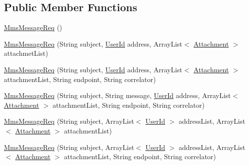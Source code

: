 \subsection*{Public Member Functions}
\begin{DoxyCompactItemize}
\item 
\hyperlink{classcom_1_1bluevia_1_1messagery_1_1mt_1_1mms_1_1data_1_1MmsMessageReq_a1d501dc4bd77173c12d12d321304e68e}{MmsMessageReq} ()
\item 
\hyperlink{classcom_1_1bluevia_1_1messagery_1_1mt_1_1mms_1_1data_1_1MmsMessageReq_a3ba28af29d71ecde161c1fda1d6c6350}{MmsMessageReq} (String subject, \hyperlink{classcom_1_1bluevia_1_1commons_1_1data_1_1UserId}{UserId} address, ArrayList$<$ \hyperlink{classcom_1_1bluevia_1_1messagery_1_1mt_1_1mms_1_1data_1_1Attachment}{Attachment} $>$ attachmetList)
\item 
\hyperlink{classcom_1_1bluevia_1_1messagery_1_1mt_1_1mms_1_1data_1_1MmsMessageReq_a1b19606237a5366b0a34df959d026744}{MmsMessageReq} (String subject, \hyperlink{classcom_1_1bluevia_1_1commons_1_1data_1_1UserId}{UserId} address, ArrayList$<$ \hyperlink{classcom_1_1bluevia_1_1messagery_1_1mt_1_1mms_1_1data_1_1Attachment}{Attachment} $>$ attachmentList, String endpoint, String correlator)
\item 
\hyperlink{classcom_1_1bluevia_1_1messagery_1_1mt_1_1mms_1_1data_1_1MmsMessageReq_a8760a1c5fcaeb1f1ff00f97ff5db99fa}{MmsMessageReq} (String subject, String message, \hyperlink{classcom_1_1bluevia_1_1commons_1_1data_1_1UserId}{UserId} address, ArrayList$<$ \hyperlink{classcom_1_1bluevia_1_1messagery_1_1mt_1_1mms_1_1data_1_1Attachment}{Attachment} $>$ attachmentList, String endpoint, String correlator)
\item 
\hyperlink{classcom_1_1bluevia_1_1messagery_1_1mt_1_1mms_1_1data_1_1MmsMessageReq_aea519e7942f1e97f19233ef1cf27808d}{MmsMessageReq} (String subject, ArrayList$<$ \hyperlink{classcom_1_1bluevia_1_1commons_1_1data_1_1UserId}{UserId} $>$ addressList, ArrayList$<$ \hyperlink{classcom_1_1bluevia_1_1messagery_1_1mt_1_1mms_1_1data_1_1Attachment}{Attachment} $>$ attachmentList)
\item 
\hyperlink{classcom_1_1bluevia_1_1messagery_1_1mt_1_1mms_1_1data_1_1MmsMessageReq_afdfb58b8cb60eb6c7e174fbb2bbb4180}{MmsMessageReq} (String subject, ArrayList$<$ \hyperlink{classcom_1_1bluevia_1_1commons_1_1data_1_1UserId}{UserId} $>$ addressList, ArrayList$<$ \hyperlink{classcom_1_1bluevia_1_1messagery_1_1mt_1_1mms_1_1data_1_1Attachment}{Attachment} $>$ attachmentList, String endpoint, String correlator)

\end{DoxyCompactItemize}
